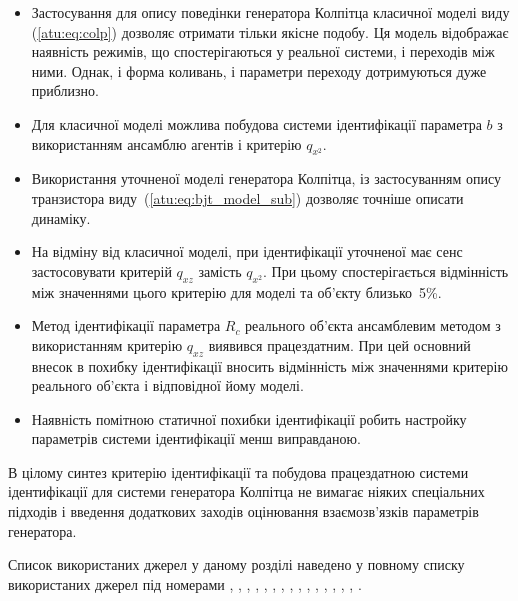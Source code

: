 \begin{itemize}

  \item
    Застосування для опису поведінки генератора Колпітца
    класичної моделі виду (\ref{atu:eq:colp}) дозволяє отримати тільки
    якісне подобу. Ця модель відображає наявність режимів, що
    спостерігаються у реальної системи, і переходів між ними. Однак,
    і форма коливань, і параметри переходу дотримуються дуже
    приблизно.

  \item
    Для класичної моделі можлива побудова системи ідентифікації
    параметра
    $b$ з використанням ансамблю агентів і критерію
    $q_{x^2} $.

  \item
    Використання уточненої моделі генератора Колпітца, із
    застосуванням опису транзистора виду~(\ref{atu:eq:bjt_model_sub}) дозволяє
    точніше описати динаміку.

  \item
    На відміну від класичної моделі, при ідентифікації уточненої
    має сенс застосовувати критерій
    $q_{xz} $ замість
    $q_{x^2} $. При цьому спостерігається відмінність між значеннями
    цього критерію для моделі та об'єкту близько~5\%.

  \item
    Метод ідентифікації параметра
    $R_c$ реального об'єкта ансамблевим методом з використанням
    критерію
    $q_{xz}$ виявився працездатним. При цей основний внесок в похибку
    ідентифікації вносить відмінність між значеннями критерію
    реального об'єкта і відповідної йому моделі.

  \item
    Наявність помітною статичної похибки ідентифікації робить
    настройку параметрів системи ідентифікації менш виправданою.

\end{itemize}


В цілому синтез критерію ідентифікації та побудова працездатною
системи ідентифікації для системи генератора Колпітца
не вимагає ніяких спеціальних підходів і введення
додаткових заходів оцінювання взаємозв'язків параметрів
генератора.

Список використаних джерел у даному розділі наведено у повному
списку використаних джерел під номерами
\cite{atu_apir2013},
\cite{atu_st104a},
\cite{DBLP:journals/corr/WangWQ15},
\cite{dmitriev_gen_chaos},
\cite{doi:10.1063/1.4705999},
\cite{gummel_poon_1970},
\cite{shiskin_electronnie_pribori},
\cite{horowitz},
\cite{kennedy_chaos_colpitts},
\cite{atu_asau21},
\cite{Kennedy_Colpitts_predicting},
\cite{Kennedy_Colpitts_Chua},
\cite{PhysRevE.80.016201},
\cite{picovskii_syncro},
\cite{bonetti_super_persistent_colpitts},
\cite{zaeplnii_radio_calc}.


